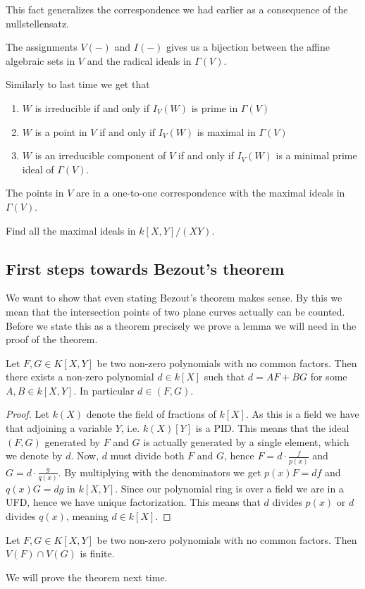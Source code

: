 This fact generalizes the correspondence we had earlier as a consequence of the nullstellensatz.


\begin{proposition}
The assignments $V(-)$ and $I(-)$ gives us a bijection between the affine algebraic sets in $V$ and the radical ideals in $\Gamma(V)$. 
\end{proposition}

Similarly to last time we get that
\begin{enumerate}
    \item $W$ is irreducible if and only if $I_V(W)$ is prime in $\Gamma(V)$
    \item $W$ is a point in $V$ if and only if $I_V(W)$ is maximal in $\Gamma(V)$
    \item $W$ is an irreducible component of $V$ if and only if $I_V(W)$ is a minimal prime ideal of $\Gamma(V)$.
\end{enumerate}

\begin{corollary}
The points in $V$ are in a one-to-one correspondence with the maximal ideals in $\Gamma(V)$.
\end{corollary}

\begin{problem}
Find all the maximal ideals in $k[X, Y]/(XY)$. 
\end{problem}

\subsection{First steps towards Bezout's theorem}

We want to show that even stating Bezout's theorem makes sense. By this we mean that the intersection points of two plane curves actually can be counted. Before we state this as a theorem precisely we prove a lemma we will need in the proof of the theorem. 

\begin{lemma}
Let $F, G\in K[X, Y]$ be two non-zero polynomials with no common factors. Then there exists a non-zero polynomial $d\in k[X]$ such that $d=AF+BG$ for some $A, B\in k[X, Y]$. In particular $d\in (F, G)$. 
\end{lemma}
\begin{proof}
Let $k(X)$ denote the field of fractions of $k[X]$. As this is a field we have that adjoining a variable $Y$, i.e. $k(X)[Y]$ is a PID. This means that the ideal $(F, G)$ generated by $F$ and $G$ is actually generated by a single element, which we denote by $d$. Now, $d$ must divide both $F$ and $G$, hence $F=d\cdot \frac{f}{p(x)}$ and $G=d\cdot \frac{g}{q(x)}$. By multiplying with the denominators we get $p(x)F=df$ and $q(x)G = dg$ in $k[X, Y]$. Since our polynomial ring is over a field we are in a UFD, hence we have unique factorization. This means that $d$ divides $p(x)$ or $d$ divides $q(x)$, meaning $d\in k[X]$. 
\end{proof}

\begin{theorem}
Let $F, G\in K[X, Y]$ be two non-zero polynomials with no common factors. Then $V(F)\cap V(G)$ is finite. 
\end{theorem}

We will prove the theorem next time. 
